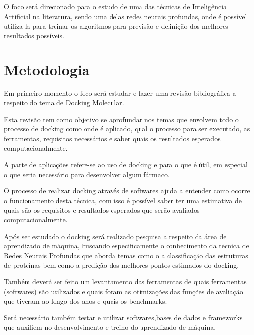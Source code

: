 \documentclass[tcc, capa]{texucpel}
\begin{document}
O foco será direcionado para o estudo de uma das técnicas de Inteligência Artificial na literatura, sendo uma delas redes neurais profundas, onde é possível utiliza-la para treinar os algoritmos para previsão e definição dos melhores resultados possíveis. 


\chapter{Metodologia}

Em primeiro momento o foco será estudar e fazer uma revisão bibliográfica a respeito do tema de Docking Molecular.

Esta revisão tem como objetivo se aprofundar nos temas que envolvem todo o processo de docking como onde é aplicado, qual o processo para ser executado, as ferramentas, requisitos necessários  e saber quais os resultados esperados computacionalmente.

A parte de aplicações refere-se ao uso de docking e para o que é útil,  em especial o que seria necessário para desenvolver algum fármaco.

O processo de realizar docking através de softwares ajuda a entender como ocorre o funcionamento desta técnica, com isso é possível saber ter uma estimativa de quais são os requisitos e resultados esperados que serão avaliados computacionalmente.
% 
% 

Após ser estudado o docking será realizado pesquisa a respeito da área de aprendizado de máquina, buscando especificamente o conhecimento da técnica de Redes Neurais Profundas que aborda temas como o a classificação das estruturas de proteínas bem como a predição dos melhores pontos estimados do docking.

Também deverá ser feito um levantamento das ferramentas de quais ferramentas (softwares) são utilizados e quais foram as otimizações das funções de avaliação que tiveram ao longo dos anos e quais os benchmarks.

Será necessário também testar e utilizar softwares,bases de dados e  frameworks que auxiliem no desenvolvimento e treino do aprendizado de máquina.

\end{document}
